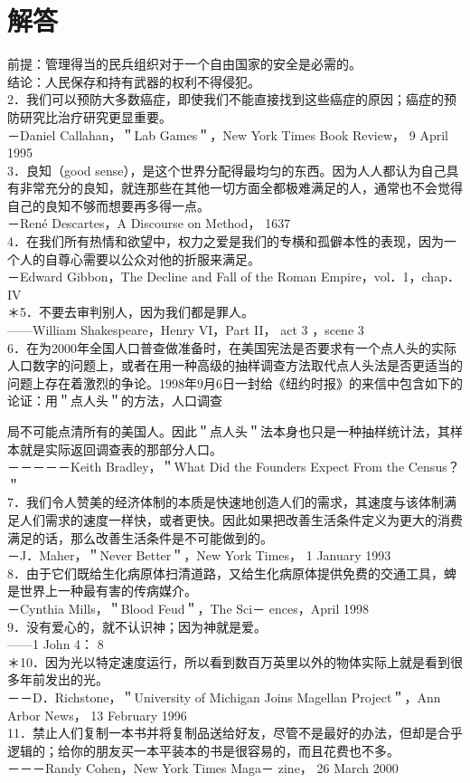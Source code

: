 \section*{解答}
前提：管理得当的民兵组织对于一个自由国家的安全是必需的。\\
结论：人民保存和持有武器的权利不得侵犯。\\
2．我们可以预防大多数癌症，即使我们不能直接找到这些癌症的原因；癌症的预防研究比治疗研究更显重要。\\
－Daniel Callahan，＂Lab Games＂，New York Times Book Review， 9 April 1995\\
3．良知（good sense），是这个世界分配得最均匀的东西。因为人人都认为自己具有非常充分的良知，就连那些在其他一切方面全都极难满足的人，通常也不会觉得自己的良知不够而想要再多得一点。\\
－René Descartes，A Discourse on Method， 1637\\
4．在我们所有热情和欲望中，权力之爱是我们的专横和孤僻本性的表现，因为一个人的自尊心需要以公众对他的折服来满足。\\
－Edward Gibbon，The Decline and Fall of the Roman Empire，vol．1，chap．IV\\
＊5．不要去审判别人，因为我们都是罪人。\\
——William Shakespeare，Henry VI，Part II， act 3 ，scene 3\\
6．在为2000年全国人口普查做准备时，在美国宪法是否要求有一个点人头的实际人口数字的问题上，或者在用一种高级的抽样调查方法取代点人头法是否更适当的问题上存在着激烈的争论。1998年9月6日一封给《纽约时报》的来信中包含如下的论证：用＂点人头＂的方法，人口调查

局不可能点清所有的美国人。因此＂点人头＂法本身也只是一种抽样统计法，其样本就是实际返回调查表的那部分人口。\\
－－－－－Keith Bradley，＂What Did the Founders Expect From the Census？＂\\
7．我们令人赞美的经济体制的本质是快速地创造人们的需求，其速度与该体制满足人们需求的速度一样快，或者更快。因此如果把改善生活条件定义为更大的消费满足的话，那么改善生活条件是不可能做到的。\\
－J．Maher，＂Never Better＂，New York Times， 1 January 1993\\
8．由于它们既给生化病原体扫清道路，又给生化病原体提供免费的交通工具，蜱是世界上一种最有害的传病媒介。\\
－Cynthia Mills，＂Blood Feud＂，The Sci－ ences，April 1998\\
9．没有爱心的，就不认识神；因为神就是爱。\\
——1 John 4： 8\\
＊10．因为光以特定速度运行，所以看到数百万英里以外的物体实际上就是看到很多年前发出的光。\\
－－D．Richstone，＂University of Michigan Joins Magellan Project＂，Ann Arbor News， 13 February 1996\\
11．禁止人们复制一本书并将复制品送给好友，尽管不是最好的办法，但却是合乎逻辑的；给你的朋友买一本平装本的书是很容易的，而且花费也不多。\\
－－－Randy Cohen，New York Times Maga－ zine， 26 March 2000

